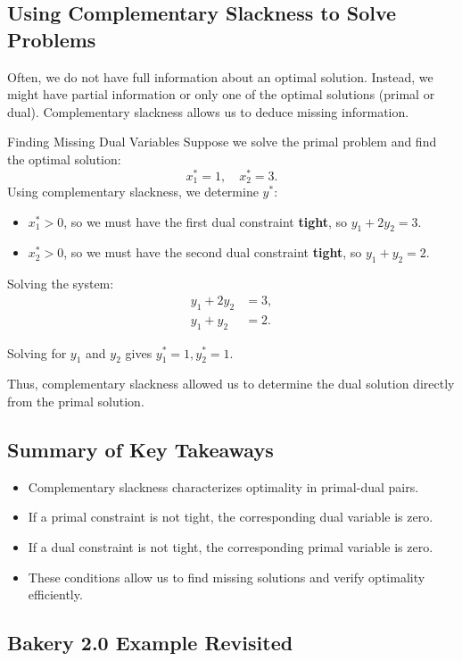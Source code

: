 \subsection{Using Complementary Slackness to Solve Problems}
Often, we do not have full information about an optimal solution. Instead, we might have partial information or only one of the optimal solutions (primal or dual). Complementary slackness allows us to deduce missing information.


\begin{example}{Finding Missing Dual Variables}{}
Suppose we solve the primal problem and find the optimal solution:
\[
x_1^* = 1, \quad x_2^* = 3.
\]
Using complementary slackness, we determine $y^*$:
\begin{itemize}
\item $x_1^* > 0$, so we must have the first dual constraint \textbf{tight}, so $y_1 + 2y_2 = 3$.
\item $x_2^* > 0$, so we must have the second dual constraint \textbf{tight}, so $ y_1 + y_2 = 2$.
\end{itemize}

Solving the system:
\begin{align*}
   y_1 + 2y_2 &= 3, \\
   y_1 + y_2 &= 2.
\end{align*}

Solving for $y_1$ and $y_2$ gives $y_1^* = 1, y_2^* = 1$.

Thus, complementary slackness allowed us to determine the dual solution directly from the primal solution.
\end{example}

\subsection{Summary of Key Takeaways}
\begin{itemize}
\item Complementary slackness characterizes optimality in primal-dual pairs.
\item If a primal constraint is not tight, the corresponding dual variable is zero.
\item If a dual constraint is not tight, the corresponding primal variable is zero.
\item These conditions allow us to find missing solutions and verify optimality efficiently.
\end{itemize}


\subsection*{Bakery 2.0 Example Revisited}

